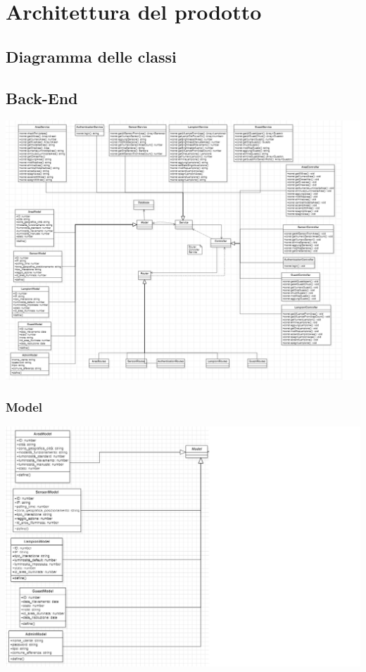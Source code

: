 \documentclass[12pt]{article}
\begin{document}
\section{Architettura del prodotto}

\subsection{Diagramma delle classi}
\subsection{Back-End}
\includegraphics[width=475pt]{Back-End.png}
\subsubsection{Model}
\includegraphics[width=475pt]{Model.png}
\end{document}
